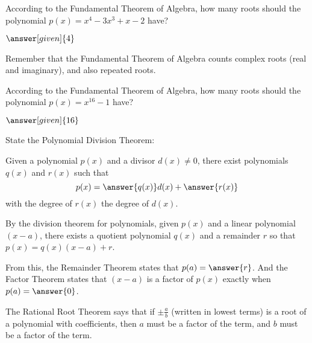 \documentclass[nooutcomes]{ximera}
\begin{document}
\begin{problem}
According to the Fundamental Theorem of Algebra, how many roots should the polynomial $p(x) = x^4 - 3x^3 + x - 2$ have?
\begin{prompt}
	$\answer[given]{4}$
\end{prompt}
\begin{hint}
	Remember that the Fundamental Theorem of Algebra counts complex roots (real and imaginary), and also repeated roots.
\end{hint}
\end{problem}



\begin{problem}
According to the Fundamental Theorem of Algebra, how many roots should the polynomial $p(x) = x^{16} - 1$ have?
\begin{prompt}
	$\answer[given]{16}$
\end{prompt}
\end{problem}

\begin{problem}
State the Polynomial Division Theorem: 

Given a polynomial $p(x)$ and a divisor $d(x)\ne 0$, there exist polynomials $q(x)$ and $r(x)$ such that 
\[
p(x) = \answer{q(x)}d(x)+\answer{r(x)}
\]
with the degree of $r(x)$ 
\wordChoice{\choice{$=$} \choice[correct]{$<$} \choice{$\le$} \choice{$\ne$} \choice{$>$}}
the degree of $d(x)$. 
\end{problem}

\begin{problem}
By the division theorem for polynomials, given $p(x)$ and a linear polynomial $(x-a)$, there exists a quotient polynomial $q(x)$ and a remainder $r$ so that $p(x)= q(x)(x-a) + r$.  

From this, the Remainder Theorem states that $p(a)=\answer{r}$.  And the Factor Theorem states that $(x-a)$ is a factor of $p(x)$ exactly when $p(a)=\answer{0}$.
\end{problem}

\begin{problem}
The Rational Root Theorem says that if $\pm \frac{a}{b}$ (written in lowest terms) is a root of a polynomial with 
coefficients, then $a$ must be a factor of the 
 term, and $b$ must be a factor of the 
term.
\end{problem}
\end{document}
